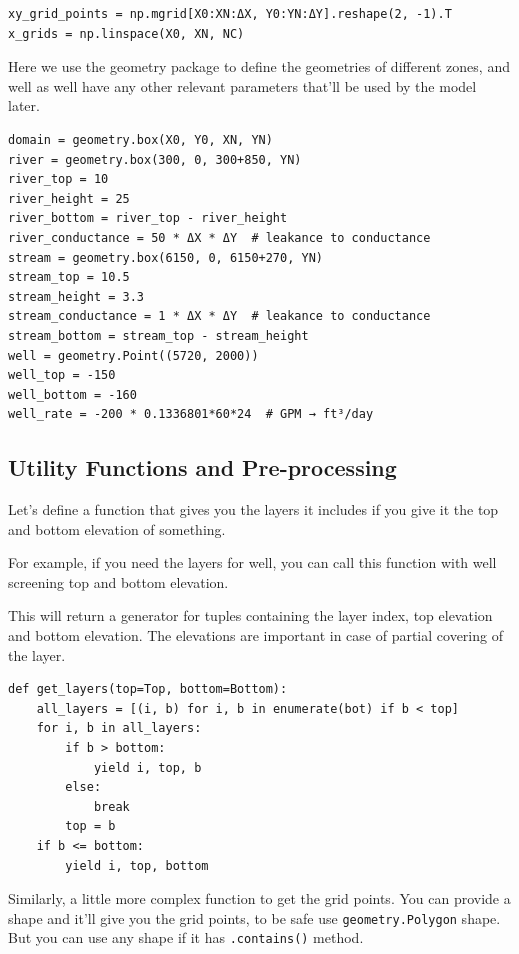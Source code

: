 \documentclass[titlepage,12pt]{unisubmission}
\begin{document}
\begin{verbatim}
xy_grid_points = np.mgrid[X0:XN:ΔX, Y0:YN:ΔY].reshape(2, -1).T
x_grids = np.linspace(X0, XN, NC)
\end{verbatim}


Here we use the geometry package to define the geometries of different zones, and well as well have any other relevant parameters that'll be used by the model later.

\begin{verbatim}
domain = geometry.box(X0, Y0, XN, YN)
river = geometry.box(300, 0, 300+850, YN)
river_top = 10
river_height = 25
river_bottom = river_top - river_height
river_conductance = 50 * ΔX * ΔY  # leakance to conductance
stream = geometry.box(6150, 0, 6150+270, YN)
stream_top = 10.5
stream_height = 3.3
stream_conductance = 1 * ΔX * ΔY  # leakance to conductance
stream_bottom = stream_top - stream_height
well = geometry.Point((5720, 2000))
well_top = -150
well_bottom = -160
well_rate = -200 * 0.1336801*60*24  # GPM → ft³/day
\end{verbatim}

\subsection{Utility Functions and Pre-processing}
\label{sec:orgbfd30a4}
Let's define a function that gives you the layers it includes if you give it the top and bottom elevation of something.

For example, if you need the layers for well, you can call this function with well screening top and bottom elevation.

This will return a generator for tuples containing the layer index, top elevation and bottom elevation. The elevations are important in case of partial covering of the layer.

\begin{verbatim}
def get_layers(top=Top, bottom=Bottom):
    all_layers = [(i, b) for i, b in enumerate(bot) if b < top]
    for i, b in all_layers:
        if b > bottom:
            yield i, top, b
        else:
            break
        top = b
    if b <= bottom:
        yield i, top, bottom
\end{verbatim}


Similarly, a little more complex function to get the grid points. You can provide a shape and it'll give you the grid points, to be safe use \texttt{geometry.Polygon} shape. But you can use any shape if it has \texttt{.contains()} method.
\end{document}
